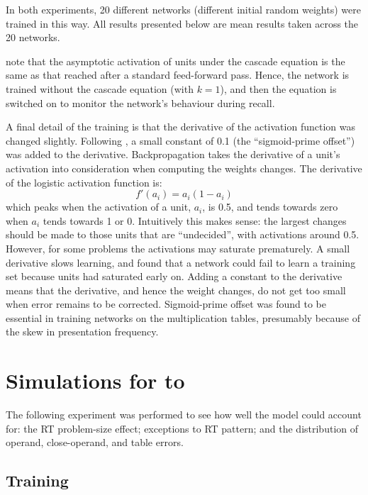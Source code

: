 In both experiments, 20 different networks (different initial random
weights) were trained in this way. All results presented below are
mean results taken across the 20 networks.

 note that the asymptotic activation of units under the
cascade equation is the same as that reached after a standard feed-forward
pass. Hence, the network is trained without the cascade equation (with
$k=1$), and then the equation is switched on to monitor the network's
behaviour during recall.

A final detail of the training is that the
derivative of the activation function was
changed slightly. Following , a small constant of 0.1 (the
``sigmoid-prime offset'') was
added to the derivative.  Backpropagation
takes the derivative of a unit's activation into consideration when
computing the weights changes.  The derivative of the logistic
activation function is:
$$ f'(a_i) = a_i(1-a_i) $$
\noindent which peaks when the activation of a unit, $a_i$, is 0.5, and
tends towards zero when $a_i$ tends towards 1 or 0.
Intuitively this makes sense: the largest changes should be made to those
units that are ``undecided'', with activations around 0.5.  However, for
some problems the activations may saturate prematurely.
A small derivative slows
learning, and \citeauthor{fahlempi} found that a
network could fail to learn a training set because units had saturated
early on.  Adding a constant to the derivative means that the derivative,
and hence the weight changes, do not get too small when error
remains to be corrected.  Sigmoid-prime offset was found to be essential in
training networks on the multiplication tables, presumably because of the
skew in presentation frequency.


\section{Simulations for  to }\label{s:29sim}

The following experiment was performed to see how well the
model could account for: the RT problem-size effect; exceptions to RT
pattern; and the distribution of operand, close-operand, and table errors.

\subsection{Training}


